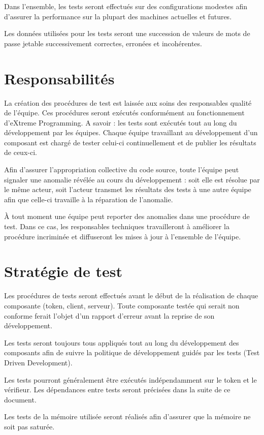\documentclass{"../../res/univ-projet"}
\begin{document}
  Dans l'ensemble, les tests seront effectués sur des configurations modestes afin d'assurer la performance sur la plupart des machines actuelles et futures.
  
  Les données utilisées pour les tests seront une succession de valeurs de mots de passe jetable successivement correctes, erronées et incohérentes.
  
  \section{Responsabilités}
  La création des procédures de test est laissée aux soins des responsables qualité de l'équipe. Ces procédures seront exécutés conformément au fonctionnement d'eXtreme Programming. A savoir : les tests sont exécutés tout au long du développement par les équipes. Chaque équipe travaillant au développement d'un composant est chargé de tester celui-ci continuellement et de publier les résultats de ceux-ci.
  
  Afin d'assurer l'appropriation collective du code source, toute l'équipe peut signaler une anomalie révélée au cours du développement : soit elle est résolue par le même acteur, soit l'acteur transmet les résultats 
des tests à une autre équipe afin que celle-ci travaille à la réparation de l'anomalie.
  
  \`A tout moment une équipe peut reporter des anomalies dans une procédure de test. Dans ce cas, les responsables techniques travailleront à améliorer la procédure incriminée et diffuseront les mises à jour à l'ensemble de l'équipe.
  
  \section{Stratégie de test}
  Les procédures de tests seront effectués avant le début de la réalisation de chaque composante (token, client, serveur). Toute composante testée qui serait non conforme ferait l'objet d'un 
  rapport d'erreur avant la reprise de son développement.
  
  Les tests seront toujours tous appliqués tout au long du développement des composants afin de suivre la politique de développement guidés par les tests (Test Driven Development).
    
  Les tests pourront généralement être exécutés indépendamment sur le token et le vérifieur. Les dépendances entre tests seront précisées dans la suite de ce document.
  
  Les tests de la mémoire utilisée seront réalisés afin d'assurer que la mémoire ne soit pas saturée.
  
\end{document}

